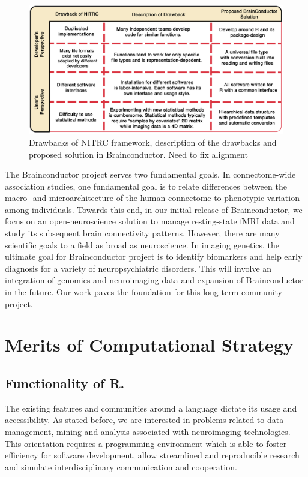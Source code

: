 \documentclass{nature}
\begin{document}
\begin{figure}[tb]
\centering
\includegraphics[width=400pt]{fig/brainconductor/brainconductor_nitrc_chart_v2.png}
\caption{Drawbacks of NITRC framework, description of the drawbacks and proposed
solution
in Brainconductor. {\color{red}Need to fix alignment}
}
\label{fig:nitrc}
\end{figure}


The Brainconductor project serves two fundamental goals. In connectome-wide
association studies, one fundamental goal is to relate differences between the
macro- and
microarchitecture of the human connectome to phenotypic variation among
individuals\cite{milham2012open}. Towards this end,
in our
initial release of Brainconductor, we focus on an open-neuroscience
solution to manage resting-state fMRI data and study its
subsequent brain connectivity patterns.
However, there are many scientific goals to a field as broad as neuroscience.
In imaging genetics, the ultimate goal
for Brainconductor project is to identify biomarkers and help early diagnosis
for a variety of neuropsychiatric disorders. This will involve an
integration of genomics and neuroimaging data and expansion of Brainconductor
in the future. Our work paves the foundation for this long-term community 
project.


\section{Merits of Computational Strategy}

\subsection{Functionality of R.}
The existing features and communities around a language dictate
its usage and accessibility. As stated before, we are
interested in problems related to data management, mining and analysis
associated with neuroimaging technologies. This orientation requires
a programming environment which is able to foster
efficiency for software development, allow
streamlined and reproducible research and simulate
interdisciplinary communication and cooperation.
\end{document}
